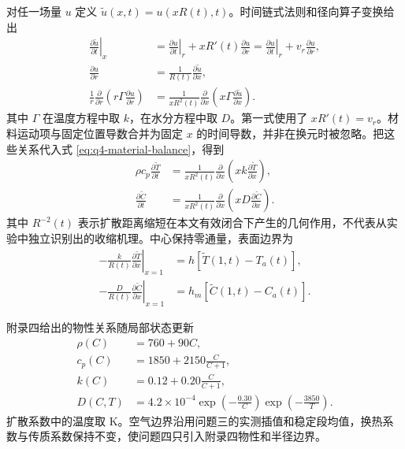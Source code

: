 \documentclass[withoutpreface,bwprint]{cumcmthesis}
\begin{document}
对任一场量 \(u\) 定义 \(\widetilde u(x,t)=u(xR(t),t)\)。时间链式法则和径向算子变换给出
\begin{subequations}
\label{eq:q4-chain-rules}
\begin{align}
\left.\frac{\partial \widetilde{u}}{\partial t}\right|_{x}
&=
\left.\frac{\partial u}{\partial t}\right|_{r}
+xR'(t)\frac{\partial u}{\partial r}
=\left.\frac{\partial u}{\partial t}\right|_{r}
+v_r\frac{\partial u}{\partial r},
\label{eq:material-derivative}\\
\frac{\partial u}{\partial r}
&=\frac{1}{R(t)}\frac{\partial\widetilde u}{\partial x},\\
\frac{1}{r}\frac{\partial}{\partial r}
\left(r\Gamma\frac{\partial u}{\partial r}\right)
&=\frac{1}{xR^2(t)}\frac{\partial}{\partial x}
\left(x\Gamma\frac{\partial\widetilde u}{\partial x}\right).
\end{align}
\end{subequations}
其中 \(\Gamma\) 在温度方程中取 \(k\)，在水分方程中取 \(D\)。第一式使用了 \(xR'(t)=v_r\)。材料运动项与固定位置导数合并为固定 \(x\) 的时间导数，并非在换元时被忽略。把这些关系代入式 \ref{eq:q4-material-balance}，得到
\begin{align}
\rho c_p\frac{\partial \widetilde{T}}{\partial t}
&=
\frac{1}{xR^2(t)}
\frac{\partial}{\partial x}
\left(
xk\frac{\partial \widetilde{T}}{\partial x}
\right),
\label{eq:moving-heat}\\
\frac{\partial \widetilde{C}}{\partial t}
&=
\frac{1}{xR^2(t)}
\frac{\partial}{\partial x}
\left(
xD\frac{\partial \widetilde{C}}{\partial x}
\right).
\label{eq:moving-moisture}
\end{align}
其中 \(R^{-2}(t)\) 表示扩散距离缩短在本文有效闭合下产生的几何作用，不代表从实验中独立识别出的收缩机理。中心保持零通量，表面边界为
\begin{align}
-\frac{k}{R(t)}\left.\frac{\partial\widetilde{T}}{\partial x}\right|_{x=1}
&=h\left[\widetilde{T}(1,t)-T_a(t)\right],\\
-\frac{D}{R(t)}\left.\frac{\partial\widetilde{C}}{\partial x}\right|_{x=1}
&=h_m\left[\widetilde{C}(1,t)-C_a(t)\right].
\label{eq:moving-boundaries}
\end{align}

附录四给出的物性关系随局部状态更新
\begin{align}
\rho(C)&=760+90C,\\
c_p(C)&=1850+2150\frac{C}{C+1},\\
k(C)&=0.12+0.20\frac{C}{C+1},\\
D(C,T)&=4.2\times10^{-4}
\exp\left(-\frac{0.30}{C}\right)
\exp\left(-\frac{3850}{T}\right).
\label{eq:q4-properties}
\end{align}
扩散系数中的温度取 K。空气边界沿用问题三的实测插值和稳定段均值，换热系数与传质系数保持不变，使问题四只引入附录四物性和半径边界。
\end{document}
